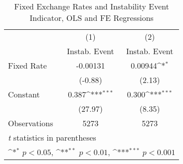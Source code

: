 \begin{table}[htbp]\centering
\def\sym#1{\ifmmode^{#1}\else\(^{#1}\)\fi}
\caption{Fixed Exchange Rates and Instability Event Indicator, OLS and FE Regressions \label{instabRRalone}}
\begin{tabular}{l*{2}{c}}
\toprule
                                        &\multicolumn{1}{c}{(1)}&\multicolumn{1}{c}{(2)}\\
                                        &\multicolumn{1}{c}{Instab. Event}&\multicolumn{1}{c}{Instab. Event}\\
\midrule
Fixed Rate                              & -0.00131         &  0.00944\sym{*}  \\
                                        &  (-0.88)         &   (2.13)         \\
\addlinespace
Constant                                &    0.387\sym{***}&    0.300\sym{***}\\
                                        &  (27.97)         &   (8.35)         \\
\midrule
Observations                            &     5273         &     5273         \\
\bottomrule
\multicolumn{3}{l}{\footnotesize \textit{t} statistics in parentheses}\\
\multicolumn{3}{l}{\footnotesize \sym{*} \(p<0.05\), \sym{**} \(p<0.01\), \sym{***} \(p<0.001\)}\\
\end{tabular}
\end{table}
